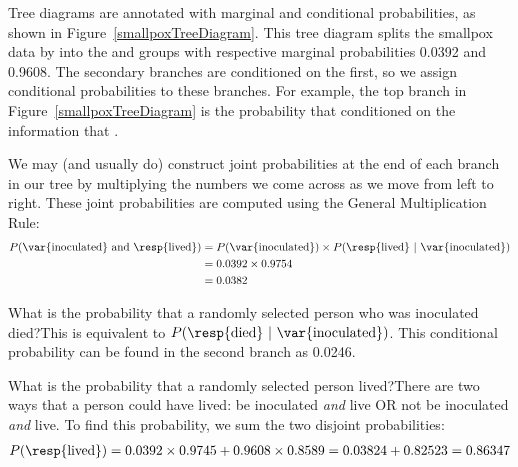 Tree diagrams are annotated with marginal and conditional probabilities, as shown in Figure~\ref{smallpoxTreeDiagram}. This tree diagram splits the smallpox data by  into the  and  groups with respective marginal probabilities 0.0392 and 0.9608. The secondary branches are conditioned on the first, so we assign conditional probabilities to these branches.
For example, the top branch in Figure~\ref{smallpoxTreeDiagram} is the probability that  conditioned on the information that .

We may (and usually do) construct joint probabilities at the end of each branch in our tree by multiplying the numbers we come across as we move from left to right. These joint probabilities are computed using the General Multiplication Rule:
\begin{align*}
P(\text{\var{inoculated} and \resp{lived}}) &= P(\text{\var{inoculated}})\times P(\text{\resp{lived}}\ |\ \text{\var{inoculated}}) \\
	&= 0.0392\times 0.9754 \\
	&=0.0382
\end{align*}

\begin{examplewrap}
\begin{nexample}{What is the probability that a randomly selected person who was inoculated died?}This is equivalent to $P(\text{\resp{died}}\ |\ \text{\var{inoculated}})$. This conditional probability can be found in the second branch as 0.0246.
\end{nexample}
\end{examplewrap}


\D{\newpage}

\begin{examplewrap}
\begin{nexample}{What is the probability that a randomly selected person lived?}There are two ways that a person could have lived:  be inoculated \emph{and} live OR not be inoculated \emph{and} live. To find this probability, we sum the two disjoint probabilities:
\begin{align*}
P(\text{\resp{lived}}) = 0.0392 \times 0.9745 + 0.9608 \times 0.8589 = 0.03824 + 0.82523 = 0.86347
\end{align*}
\end{nexample}
\end{examplewrap}


